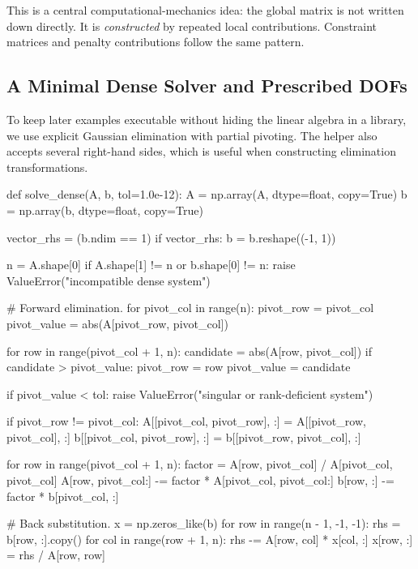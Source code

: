 This is a central computational-mechanics idea: the global matrix is not written
down directly. It is \textit{constructed} by repeated local contributions.
Constraint matrices and penalty contributions follow the same pattern.

\subsection{A Minimal Dense Solver and Prescribed DOFs}

To keep later examples executable without hiding the linear algebra in a library,
we use explicit Gaussian elimination with partial pivoting. The helper also
accepts several right-hand sides, which is useful when constructing elimination
transformations.

\begin{python}
def solve_dense(A, b, tol=1.0e-12):
    A = np.array(A, dtype=float, copy=True)
    b = np.array(b, dtype=float, copy=True)

    vector_rhs = (b.ndim == 1)
    if vector_rhs:
        b = b.reshape((-1, 1))

    n = A.shape[0]
    if A.shape[1] != n or b.shape[0] != n:
        raise ValueError("incompatible dense system")

    # Forward elimination.
    for pivot_col in range(n):
        pivot_row = pivot_col
        pivot_value = abs(A[pivot_row, pivot_col])

        for row in range(pivot_col + 1, n):
            candidate = abs(A[row, pivot_col])
            if candidate > pivot_value:
                pivot_row = row
                pivot_value = candidate

        if pivot_value < tol:
            raise ValueError("singular or rank-deficient system")

        if pivot_row != pivot_col:
            A[[pivot_col, pivot_row], :] = A[[pivot_row, pivot_col], :]
            b[[pivot_col, pivot_row], :] = b[[pivot_row, pivot_col], :]

        for row in range(pivot_col + 1, n):
            factor = A[row, pivot_col] / A[pivot_col, pivot_col]
            A[row, pivot_col:] -= factor * A[pivot_col, pivot_col:]
            b[row, :] -= factor * b[pivot_col, :]

    # Back substitution.
    x = np.zeros_like(b)
    for row in range(n - 1, -1, -1):
        rhs = b[row, :].copy()
        for col in range(row + 1, n):
            rhs -= A[row, col] * x[col, :]
        x[row, :] = rhs / A[row, row]


\end{python}
